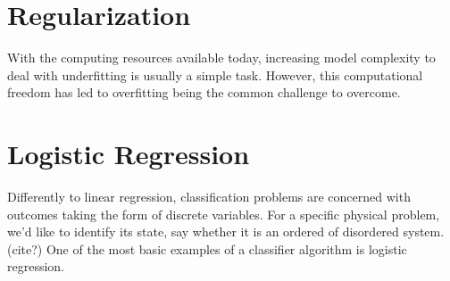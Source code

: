 \section{Regularization}\label{section:regularization}

With the computing resources available today, increasing model complexity to deal with underfitting is
usually a simple task. However, this computational freedom has led to overfitting being the common challenge
to overcome.


%
%
%
%
%
%
\section{Logistic Regression}\label{seq:logistic}
Differently to linear regression, classification problems
are concerned with outcomes taking the form of discrete variables.
For a specific physical problem, we'd like to identify its state, say whether
it is an ordered of disordered system. (cite?) One of the most basic examples
of a classifier algorithm is logistic regression.

